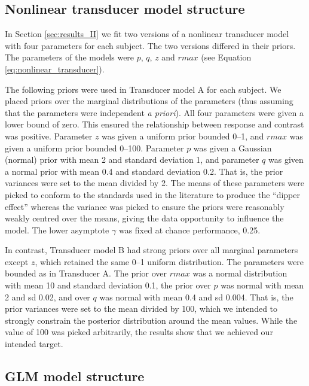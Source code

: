 \documentclass[11pt,a4paper]{article}
\begin{document}
{\subsection{Nonlinear transducer model structure}
\label{app:nonlinear_priors}

In Section \ref{sec:results_II} we fit two versions of a nonlinear transducer model with four parameters for each subject.
The two versions differed in their priors.
The parameters of the models were $p$, $q$, $z$ and $rmax$ (see Equation \ref{eq:nonlinear_transducer}).

The following priors were used in Transducer model A for each subject.
We placed priors over the marginal distributions of the parameters (thus assuming that the parameters were independent \textit{a priori}).
All four parameters were given a lower bound of zero.
This ensured the relationship between response and contrast was positive.
Parameter $z$ was given a uniform prior bounded 0--1, and $rmax$ was given a uniform prior bounded 0--100.
Parameter $p$ was given a Gaussian (normal) prior with mean 2 and standard deviation 1, and parameter $q$ was given a normal prior with mean 0.4 and standard deviation 0.2.
That is, the prior variances were set to the mean divided by 2.
The means of these parameters were picked to conform to the standards used in the literature to produce the ``dipper effect'' whereas the variance was picked to ensure the priors were reasonably weakly centred over the means, giving the data opportunity to influence the model.
The lower asymptote $\gamma$ was fixed at chance performance, 0.25.

In contrast, Transducer model B had strong priors over all marginal parameters except $z$, which retained the same 0--1 uniform distribution.
The parameters were bounded as in Transducer A.
The prior over $rmax$ was a normal distribution with mean 10 and standard deviation 0.1, the prior over $p$ was normal with mean 2 and sd 0.02, and over $q$ was normal with mean 0.4 and sd 0.004.
That is, the prior variances were set to the mean divided by 100, which we intended to strongly constrain the posterior distribution around the mean values.
While the value of 100 was picked arbitrarily, the results show that we achieved our intended target.

\subsection{GLM model structure}
\label{app:glm_priors}

}
\end{document}
